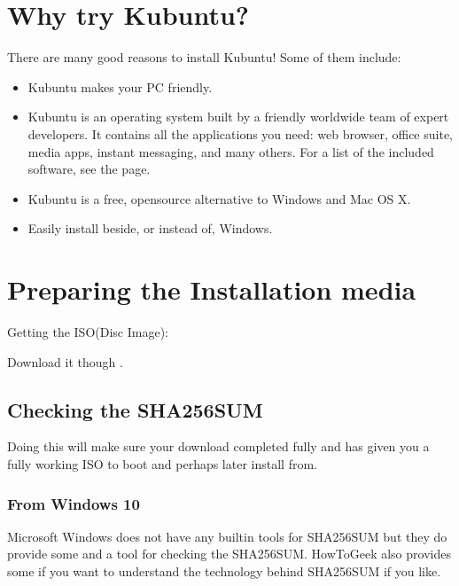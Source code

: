 \documentclass[letterpaper,10pt,english]{sphinxmanual}
\begin{document}
\section{Why try Kubuntu?}
\label{\detokenize{docs/installation:why-try-kubuntu}}
\sphinxAtStartPar
There are many good reasons to install Kubuntu!
Some of them include:
\begin{itemize}
\item {} 
\sphinxAtStartPar
Kubuntu makes your PC friendly.

\item {} 
\sphinxAtStartPar
Kubuntu is an operating system built by a friendly worldwide team of expert developers.
It contains all the applications you need: web browser, office suite, media apps,
instant messaging, and many others. For a list of the included software, see the
{\hyperref[\detokenize{docs/software-management/software:software-link}]{}} page.

\item {} 
\sphinxAtStartPar
Kubuntu is a free, open\sphinxhyphen{}source alternative to Windows and Mac OS X.

\item {} 
\sphinxAtStartPar
Easily install beside, or instead of, Windows.

\end{itemize}


\section{Preparing the Installation media}
\label{\detokenize{docs/installation:preparing-the-installation-media}}\label{\detokenize{docs/installation:get-kubuntu-link}}
\sphinxAtStartPar
Getting the ISO(Disc Image):

\sphinxAtStartPar
Download it though .


\subsection{Checking the SHA256SUM}
\label{\detokenize{docs/installation:checking-the-sha256sum}}\label{\detokenize{docs/installation:checksum-link}}
\sphinxAtStartPar
Doing this will make sure your download completed fully and has given you a fully working ISO to boot and perhaps later install from.


\subsubsection{From Windows 10}
\label{\detokenize{docs/installation:from-windows-10}}
\sphinxAtStartPar
Microsoft Windows does not have any built\sphinxhyphen{}in tools for SHA256SUM but they do
provide some  and a tool for checking the SHA256SUM. How\sphinxhyphen{}To\sphinxhyphen{}Geek also provides some  if you want to understand the technology behind SHA256SUM if you like.
\end{document}
